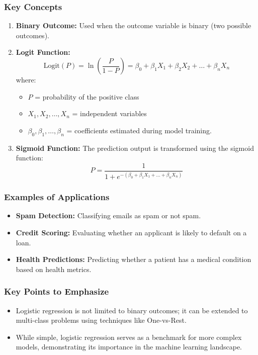 \documentclass[aspectratio=169]{beamer}
\begin{document}
\begin{frame}[fragile]
    \frametitle{Key Concepts}
    \begin{enumerate}
        \item \textbf{Binary Outcome:} Used when the outcome variable is binary (two possible outcomes).
        \item \textbf{Logit Function:}
        \begin{equation}
            \text{Logit}(P) = \ln\left(\frac{P}{1-P}\right) = \beta_0 + \beta_1 X_1 + \beta_2 X_2 + \ldots + \beta_n X_n
        \end{equation}
        where: 
        \begin{itemize}
            \item \(P\) = probability of the positive class
            \item \(X_1, X_2, \ldots, X_n\) = independent variables
            \item \(\beta_0, \beta_1, \ldots, \beta_n\) = coefficients estimated during model training.
        \end{itemize}
        \item \textbf{Sigmoid Function:} The prediction output is transformed using the sigmoid function:
        \begin{equation}
            P = \frac{1}{1 + e^{-(\beta_0 + \beta_1 X_1 + ... + \beta_n X_n)}}
        \end{equation}
    \end{enumerate}
\end{frame}

\begin{frame}[fragile]
    \frametitle{Examples of Applications}
    \begin{itemize}
        \item \textbf{Spam Detection:} Classifying emails as spam or not spam.
        \item \textbf{Credit Scoring:} Evaluating whether an applicant is likely to default on a loan.
        \item \textbf{Health Predictions:} Predicting whether a patient has a medical condition based on health metrics.
    \end{itemize}
\end{frame}

\begin{frame}[fragile]
    \frametitle{Key Points to Emphasize}
    \begin{itemize}
        \item Logistic regression is not limited to binary outcomes; it can be extended to multi-class problems using techniques like One-vs-Rest.
        \item While simple, logistic regression serves as a benchmark for more complex models, demonstrating its importance in the machine learning landscape.
    \end{itemize}
\end{frame}
\end{document}
